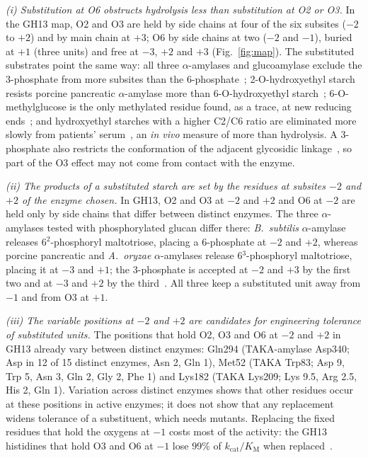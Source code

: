 \documentclass[preprint,12pt]{elsarticle}
\begin{document}
\emph{(i) Substitution at O6 obstructs hydrolysis less than substitution at O2 or O3.} In the GH13 map, O2 and O3 are
held by side chains at four of the six subsites ($-2$ to $+2$) and by main chain at $+3$; O6 by side chains at two
($-2$ and $-1$), buried at $+1$ (three units) and free at $-3$, $+2$ and $+3$ (Fig.~\ref{fig:map}). The substituted
substrates point the same way: all three $\alpha$-amylases and glucoamylase exclude the 3-phosphate from more
subsites than the 6-phosphate~\citep{Takeda1983,Takeda1987}; 2-O-hydroxyethyl starch resists porcine pancreatic
$\alpha$-amylase more than 6-O-hydroxyethyl starch~\citep{Yoshida1973}; 6-O-methylglucose is the only methylated
residue found, as a trace, at new reducing ends~\citep{vanderBurgt1998}; and hydroxyethyl starches with a higher
C2/C6 ratio are eliminated more slowly from patients' serum~\citep{Treib1995}, an \emph{in vivo} measure of more
than hydrolysis. A 3-phosphate also restricts the conformation of the adjacent glycosidic
linkage~\citep{Hansen2009}, so part of the O3 effect may not come from contact with the enzyme.

\emph{(ii) The products of a substituted starch are set by the residues at subsites $-2$ and $+2$ of the enzyme
chosen.} In GH13, O2 and O3 at $-2$ and $+2$ and O6 at $-2$ are held only by side chains that differ between distinct enzymes. The three
$\alpha$-amylases tested with phosphorylated glucan differ there: \emph{B.~subtilis} $\alpha$-amylase releases
6$^2$-phosphoryl maltotriose, placing a 6-phosphate at $-2$ and $+2$, whereas porcine pancreatic and
\emph{A.~oryzae} $\alpha$-amylases release 6$^3$-phosphoryl maltotriose, placing it at $-3$ and $+1$; the
3-phosphate is accepted at $-2$ and $+3$ by the first two and at $-3$ and $+2$ by the
third~\citep{Takeda1983,TakedaHizukuri1986,Takeda1987}. All three keep a substituted unit away from $-1$ and from O3
at $+1$.

\emph{(iii) The variable positions at $-2$ and $+2$ are candidates for engineering tolerance of substituted units.}
The positions that hold O2, O3 and O6 at $-2$ and $+2$ in GH13 already vary between distinct enzymes: Gln294 (TAKA-amylase
Asp340; Asp in 12 of 15 distinct enzymes, Asn 2, Gln 1), Met52 (TAKA Trp83; Asp 9, Trp 5, Asn 3, Gln 2, Gly 2, Phe 1) and Lys182
(TAKA Lys209; Lys 9.5, Arg 2.5, His 2, Gln 1). Variation across distinct enzymes shows that other residues occur at these positions in active enzymes; it does not show that any replacement widens tolerance of a substituent, which
needs mutants. Replacing the fixed residues that hold the oxygens at $-1$ costs most of the activity: the GH13
histidines that hold O3 and O6 at $-1$ lose 99\% of $k_\mathrm{cat}/K_\mathrm{M}$ when replaced~\citep{Sogaard1993}.
\end{document}
